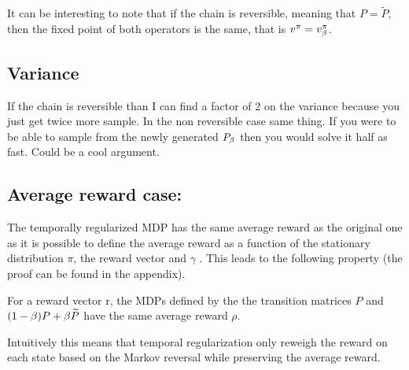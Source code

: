 \begin{remark}
It can be interesting to note that if the chain is reversible, meaning that $P = \widetilde{P}$, then the fixed point of both operators is the same, that is $v^\pi = v_\beta^\pi$.
\end{remark}

\subsection{Variance}
If the chain is reversible than I can find a factor of 2 on the variance because you just get twice more sample. In the non reversible case same thing. If you were to be able to sample from the newly generated $P_{\beta}$ then you would solve it half as fast. Could be a cool argument.
\subsection{Average reward case:} The temporally regularized MDP has the same average reward as the original one as it is possible to define the average reward \cite{tsitsiklis2002average} as a function of the stationary distribution $\pi$, the reward vector and $\gamma$ . This leads to the following property (the proof can be found in the appendix).

\begin{property}
For a reward vector r, the MDPs defined by the the transition matrices $P$ and $(1-\beta) P + \beta \widetilde{P}$ have the same average reward $\rho$.
\end{property}
Intuitively this means that temporal regularization only reweigh the reward on each state based on the Markov reversal while preserving the average reward.

